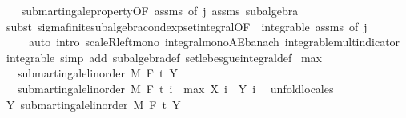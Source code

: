 \begin{isabellebody}
%
\isadelimproof
\ \ %
\endisadelimproof
%
\isatagproof
{}\isamarkupfalse%
\ submartingale{\isacharunderscore}{\kern0pt}property{\isacharbrackleft}{\kern0pt}OF\ assms{\isacharparenleft}{\kern0pt}{}{\isacharparenright}{\kern0pt}{\isacharcomma}{\kern0pt}\ of\ j{\isacharbrackright}{\kern0pt}\ assms\ subalgebra\isanewline
\ \ \isamarkupfalse%
\ {\isacharparenleft}{\kern0pt}subst\ sigma{\isacharunderscore}{\kern0pt}finite{\isacharunderscore}{\kern0pt}subalgebra{\isachardot}{\kern0pt}cond{\isacharunderscore}{\kern0pt}exp{\isacharunderscore}{\kern0pt}set{\isacharunderscore}{\kern0pt}integral{\isacharbrackleft}{\kern0pt}OF\ {\isacharunderscore}{\kern0pt}\ integrable\ assms{\isacharparenleft}{\kern0pt}{}{\isacharparenright}{\kern0pt}{\isacharcomma}{\kern0pt}\ of\ j{\isacharbrackright}{\kern0pt}{\isacharparenright}{\kern0pt}\isanewline
\ \ \ \ \ {\isacharparenleft}{\kern0pt}auto\ intro{\isacharbang}{\kern0pt}{\isacharcolon}{\kern0pt}\ scaleR{\isacharunderscore}{\kern0pt}left{\isacharunderscore}{\kern0pt}mono\ integral{\isacharunderscore}{\kern0pt}mono{\isacharunderscore}{\kern0pt}AE{\isacharunderscore}{\kern0pt}banach\ integrable{\isacharunderscore}{\kern0pt}mult{\isacharunderscore}{\kern0pt}indicator\ integrable\ simp\ add{\isacharcolon}{\kern0pt}\ subalgebra{\isacharunderscore}{\kern0pt}def\ set{\isacharunderscore}{\kern0pt}lebesgue{\isacharunderscore}{\kern0pt}integral{\isacharunderscore}{\kern0pt}def{\isacharparenright}{\kern0pt}%
\endisatagproof
{\isafoldproof}%
%
\isadelimproof
\isanewline
%
\endisadelimproof
\isanewline
{}\isamarkupfalse%
\ max{\isacharcolon}{\kern0pt}\isanewline
\ \ \ {\isachardoublequoteopen}submartingale{\isacharunderscore}{\kern0pt}linorder\ M\ F\ t\ Y{\isachardoublequoteclose}\isanewline
\ \ \ {\isachardoublequoteopen}submartingale{\isacharunderscore}{\kern0pt}linorder\ M\ F\ t\ {\isacharparenleft}{\kern0pt}{\isasymlambda}i\ {\isasymxi}{\isachardot}{\kern0pt}\ max\ {\isacharparenleft}{\kern0pt}X\ i\ {\isasymxi}{\isacharparenright}{\kern0pt}\ {\isacharparenleft}{\kern0pt}Y\ i\ {\isasymxi}{\isacharparenright}{\kern0pt}{\isacharparenright}{\kern0pt}{\isachardoublequoteclose}\isanewline
%
\isadelimproof
%
\endisadelimproof
%
\isatagproof
{}\isamarkupfalse%
\ {\isacharparenleft}{\kern0pt}unfold{\isacharunderscore}{\kern0pt}locales{\isacharparenright}{\kern0pt}\isanewline
\ \ \isamarkupfalse%
\ Y{\isacharcolon}{\kern0pt}\ submartingale{\isacharunderscore}{\kern0pt}linorder\ M\ F\ t\ Y\ \isamarkupfalse%

\end{isabellebody}
